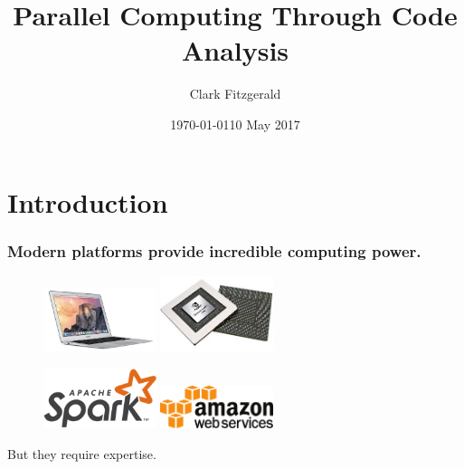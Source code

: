 \documentclass{beamer}
\begin{document}
\title{Parallel Computing Through Code Analysis}
\date{\today}
\date{10 May 2017}
\author{Clark Fitzgerald}

\frame{\titlepage}


\section{Introduction}
\begin{frame}

\frametitle{Modern platforms provide incredible computing power.}


\begin{figure}
            \includegraphics[width=1.3in]{macbook.jpg}
            \includegraphics[width=1.3in]{gpu.jpg}
\end{figure}
\begin{figure}
            \includegraphics[width=1.3in]{spark.png}
            \includegraphics[width=1.3in]{aws.png}
\end{figure}

\pause 

But they require expertise.

\end{frame}
\end{document}
